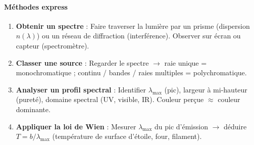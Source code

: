 \documentclass[11pt]{article}
\begin{document}
\begin{bilan}
\paragraph{Méthodes express}
\begin{enumerate}
    \item \textbf{Obtenir un spectre} : Faire traverser la lumière par un prisme (dispersion $n(\lambda)$) ou un réseau de diffraction (interférence). Observer sur écran ou capteur (spectromètre).
    \item \textbf{Classer une source} : Regarder le spectre $\to$ raie unique = monochromatique ; continu / bandes / raies multiples = polychromatique.
    \item \textbf{Analyser un profil spectral} : Identifier $\lambda_{\max}$ (pic), largeur à mi-hauteur (pureté), domaine spectral (UV, visible, IR). Couleur perçue $\approx$ couleur dominante.
    \item \textbf{Appliquer la loi de Wien} : Mesurer $\lambda_{\max}$ du pic d'émission $\to$ déduire $T = b/\lambda_{\max}$ (température de surface d'étoile, four, filament).
\end{enumerate}
\end{bilan}
\end{document}
